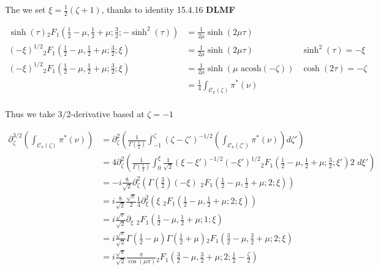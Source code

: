 \documentclass{article}
\begin{document}
The we set $\xi=\frac{1}{2}\left(\zeta+1\right)$, thanks to identity 15.4.16 \textbf{DLMF}

\begin{align*}
\sinh(\tau) {}_2F_1\left(\frac{1}{2}-\mu,\frac{1}{2}+\mu;\frac{3}{2};-\sinh^2(\tau)\right)&=\frac{1}{2\mu}\sinh(2\mu\tau) & \\
(-\xi)^{1/2} {}_2F_1\left(\frac{1}{2}-\mu,\frac{1}{2}+\mu;\frac{3}{2};\xi\right)&=\frac{1}{2\mu}\sinh(2\mu\tau)  & \sinh^2(\tau)=-\xi \\
(-\xi)^{1/2} {}_2F_1\left(\frac{1}{2}-\mu,\frac{1}{2}+\mu;\frac{3}{2};\xi\right)&=\frac{1}{2\mu}\sinh(\mu\,\,\mathrm{acosh}\left(-\zeta\right))  & \cosh(2\tau)=-\zeta \\
&=\frac{1}{4}\int_{\mathcal{C}_\pi(\zeta)}\pi^*(\nu) &\\
\end{align*}

Thus we take $3/2$-derivative based at $\zeta=-1$


\begin{align*}
\partial_{\zeta}^{3/2}\left(\int_{\mathcal{C}_\pi(\zeta)}\pi^*(\nu)\right)&=\partial_\zeta^2\left(\frac{1}{\Gamma\left(\frac{1}{2}\right)}\int_{-1}^\zeta(\zeta-\zeta')^{-1/2}\left(\int_{\mathcal{C}_\pi(\zeta')}\pi^*(\nu)\right)d\zeta'\right)\\
&=4\partial_\zeta^2\left(\frac{1}{\Gamma\left(\frac{1}{2}\right)}\int_0^\xi\frac{1}{\sqrt{2}}(\xi-\xi')^{-1/2}(-\xi')^{1/2} {}_2F_1\left(\frac{1}{2}-\mu,\frac{1}{2}+\mu;\frac{3}{2};\xi'\right) 2\,\,d\xi'\right)\\
&=-i\frac{8}{\sqrt{2}}\partial_\zeta^2\left(\Gamma\left(\tfrac{3}{2}\right)(-\xi) \,\,{}_2F_1\left(\frac{1}{2}-\mu,\frac{1}{2}+\mu;2;\xi\right)\right) \\
&=i\frac{8}{\sqrt{2}}\frac{\sqrt{\pi}}{2}\frac{1}{4}\partial_\xi^2\left(\xi\,\,{}_2F_1\left(\frac{1}{2}-\mu,\frac{1}{2}+\mu;2;\xi\right)\right)\\
&=i\frac{\sqrt{\pi}}{\sqrt{2}}\partial_{\xi}\,\, {}_2F_1\left(\frac{1}{2}-\mu,\frac{1}{2}+\mu;1;\xi\right)\\
&=i\frac{\sqrt{\pi}}{\sqrt{2}}\Gamma\left(\frac{1}{2}-\mu\right)\Gamma\left(\frac{1}{2}+\mu\right){}_2F_1\left(\frac{3}{2}-\mu,\frac{3}{2}+\mu;2;\xi\right)\\
&=i\frac{\sqrt{\pi}}{\sqrt{2}}\frac{\pi}{\cos(\mu \pi)}{}_2F_1\left(\frac{3}{2}-\mu,\frac{3}{2}+\mu;2;\frac{1}{2}-\frac{\zeta}{2}\right)
\end{align*}

\color{black}
\end{document}
